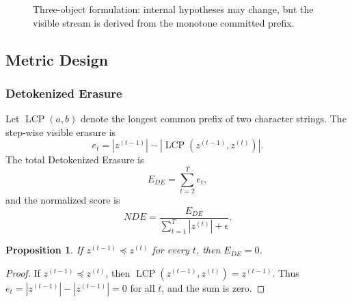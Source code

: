 \documentclass[conference]{IEEEtran}
\newtheorem{proposition}{Proposition}
\begin{document}
\begin{figure}[t]
\centering
{}
\caption{Three-object formulation: internal hypotheses may change, but the visible stream is derived from the monotone committed prefix.}
\label{fig:objects}
\end{figure}

\subsection{Metric Design}
\subsubsection{Detokenized Erasure}
Let $\operatorname{LCP}(a,b)$ denote the longest common prefix of two character strings. The step-wise visible erasure is
\begin{equation}
    e_t=\left|z^{(t-1)}\right|-\left|\operatorname{LCP}\left(z^{(t-1)},z^{(t)}\right)\right|.
\end{equation}
The total Detokenized Erasure is
\begin{equation}
    E_{DE}=\sum_{t=2}^{T} e_t,
\end{equation}
and the normalized score is
\begin{equation}
    NDE=\frac{E_{DE}}{\sum_{t=1}^{T}|z^{(t)}|+\epsilon}.
\end{equation}

\begin{proposition}
If $z^{(t-1)}\preceq z^{(t)}$ for every $t$, then $E_{DE}=0$.
\end{proposition}
\begin{proof}
If $z^{(t-1)}\preceq z^{(t)}$, then $\operatorname{LCP}(z^{(t-1)},z^{(t)})=z^{(t-1)}$. Thus $e_t=|z^{(t-1)}|-|z^{(t-1)}|=0$ for all $t$, and the sum is zero.
\end{proof}
\end{document}
